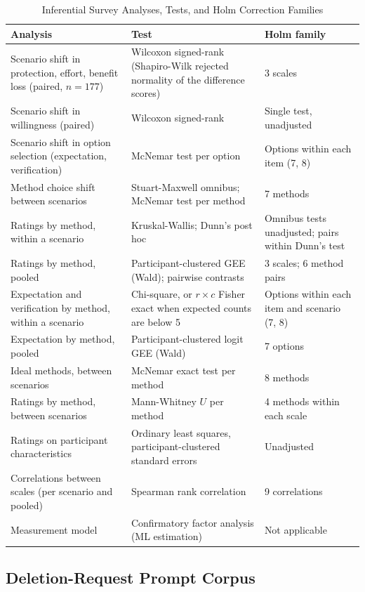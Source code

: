 \documentclass[conference,compsoc]{IEEEtran}
\begin{document}
\begin{table}[t]
\centering
\caption{Inferential Survey Analyses, Tests, and Holm Correction Families}
\label{tab:analysis-families}
\small
\begin{tabular}{@{}p{}p{}p{}@{}}
\toprule
Analysis & Test & Holm family \\
\midrule
Scenario shift in protection, effort, benefit loss (paired, $n=177$)
  & Wilcoxon signed-rank (Shapiro-Wilk rejected normality of the difference scores)
  & 3 scales \\
Scenario shift in willingness (paired)
  & Wilcoxon signed-rank
  & Single test, unadjusted \\
Scenario shift in option selection (expectation, verification)
  & McNemar test per option
  & Options within each item (7, 8) \\
Method choice shift between scenarios
  & Stuart-Maxwell omnibus; McNemar test per method
  & 7 methods \\
Ratings by method, within a scenario
  & Kruskal-Wallis; Dunn's post hoc
  & Omnibus tests unadjusted; pairs within Dunn's test \\
Ratings by method, pooled
  & Participant-clustered GEE (Wald); pairwise contrasts
  & 3 scales; 6 method pairs \\
Expectation and verification by method, within a scenario
  & Chi-square, or $r\times c$ Fisher exact when expected counts are below 5
  & Options within each item and scenario (7, 8) \\
Expectation by method, pooled
  & Participant-clustered logit GEE (Wald)
  & 7 options \\
Ideal methods, between scenarios
  & McNemar exact test per method
  & 8 methods \\
Ratings by method, between scenarios
  & Mann-Whitney $U$ per method
  & 4 methods within each scale \\
Ratings on participant characteristics
  & Ordinary least squares, participant-clustered standard errors
  & Unadjusted \\
Correlations between scales (per scenario and pooled)
  & Spearman rank correlation
  & 9 correlations \\
Measurement model
  & Confirmatory factor analysis (ML estimation)
  & Not applicable \\
\bottomrule
\end{tabular}
\end{table}

\subsection{Deletion-Request Prompt Corpus}
\label{sec:prompt-corpus}
\end{document}
